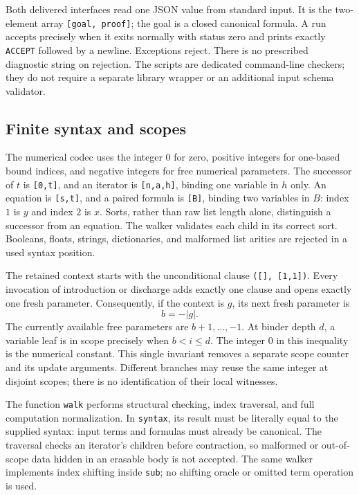 \documentclass[11pt,letterpaper]{article}
\theoremstyle{definition}\newtheorem{definition}[theorem]{Definition}
\theoremstyle{remark}\newtheorem{remark}[theorem]{Remark}
\begin{document}
Both delivered interfaces read one JSON value from standard input. It is
the two-element array \texttt{[goal, proof]}; the goal is a closed canonical
formula. A run accepts precisely when it exits normally with status zero
and prints exactly \texttt{ACCEPT} followed by a newline. Exceptions reject.
There is no prescribed diagnostic string on rejection. The scripts are
dedicated command-line checkers; they do not require a separate library
wrapper or an additional input schema validator.

\subsection{Finite syntax and scopes}

The numerical codec uses the integer $0$ for zero, positive integers for
one-based bound indices, and negative integers for free numerical parameters.
The successor of $t$ is \texttt{[0,t]}, and an iterator is
\texttt{[n,a,h]}, binding one variable in $h$ only. An equation is
\texttt{[s,t]}, and a paired formula is \texttt{[B]}, binding two variables
in $B$: index $1$ is $y$ and index $2$ is $x$. Sorts, rather than raw list
length alone, distinguish a successor from an equation. The walker validates
each child in its correct sort. Booleans, floats, strings, dictionaries,
and malformed list arities are rejected in a used syntax position.

The retained context starts with the unconditional clause
\texttt{([], [1,1])}. Every invocation of introduction or discharge adds
exactly one clause and opens exactly one fresh parameter. Consequently,
if the context is $g$, its next fresh parameter is
\[
                 b=-|g|.
\]
The currently available free parameters are $b+1,\ldots,-1$.
At binder depth $d$, a variable leaf is in scope precisely when
$b<i\le d$. The integer $0$ in this inequality is the numerical constant.
This single invariant removes a separate scope counter and its update
arguments. Different branches may reuse the same integer at disjoint scopes;
there is no identification of their local witnesses.

The function \texttt{walk} performs structural checking, index traversal,
and full computation normalization. In \texttt{syntax}, its result must be
literally equal to the supplied syntax: input terms and formulas must already
be canonical. The traversal checks an iterator's children before contraction,
so malformed or out-of-scope data hidden in an erasable body is not accepted.
The same walker implements index shifting inside \texttt{sub}; no shifting
oracle or omitted term operation is used.
\end{document}
